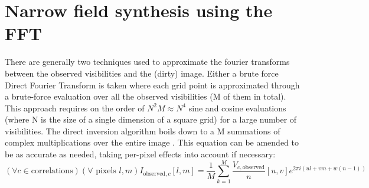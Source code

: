 \section{Narrow field synthesis using the FFT}
 There are generally two techniques used to approximate the fourier transforms between the observed visibilities and the (dirty) image. Either a brute force Direct Fourier Transform is taken where each grid point is approximated through a brute-force
 evaluation over all the observed visibilities (M of them in total). This approach requires on the order of $N^2M \approx N^4$ sine and cosine evaluations (where N is the size of a single dimension of a square grid) for a large number of visibilities. 
 The direct inversion algorithm boils down to a M summations of complex multiplications over the entire image \cite[Lecture 7]{taylor1999synthesis}. This equation can be amended to be as accurate as needed, taking per-pixel effects into 
 account if necessary:
 \begin{equation}
  (\forall c\in\text{correlations})(\forall\text{ pixels }l,m) I_{\text{observed},c}[l,m] = \frac{1}{M}\sum_{k=1}^{M}{\frac{V_{c,\text{observed}}}{n}[u,v]e^{2\pi i (ul + vm + w(n-1))}}
 \end{equation} 
 
